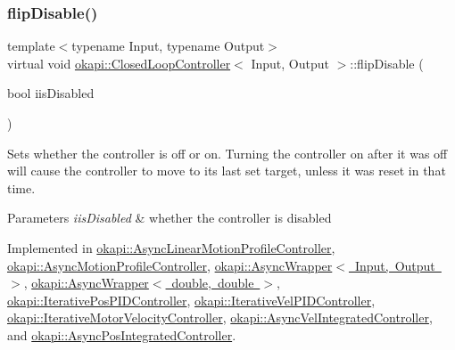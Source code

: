 \mbox{\label{classokapi_1_1ClosedLoopController_a768cd1db40ce9cd5c89b20be6e838ccc}} 
\subsubsection{\texorpdfstring{flipDisable()}{flipDisable()}\hspace{0.1cm}{\footnotesize\ttfamily [2/2]}}
{\footnotesize\ttfamily template$<$typename Input, typename Output$>$ \\
virtual void \mbox{\hyperlink{classokapi_1_1ClosedLoopController}{okapi\+::\+Closed\+Loop\+Controller}}$<$ Input, Output $>$\+::flip\+Disable (\begin{DoxyParamCaption}\item[{bool}]{iis\+Disabled }\end{DoxyParamCaption})\hspace{0.3cm}{\ttfamily [pure virtual]}}

Sets whether the controller is off or on. Turning the controller on after it was off will cause the controller to move to its last set target, unless it was reset in that time.


\begin{DoxyParams}{Parameters}
{\em iis\+Disabled} & whether the controller is disabled \\
\hline
\end{DoxyParams}


Implemented in \mbox{\hyperlink{classokapi_1_1AsyncLinearMotionProfileController_a3072d7ac1e5d0f387f739657e9f82fd8}{okapi\+::\+Async\+Linear\+Motion\+Profile\+Controller}}, \mbox{\hyperlink{classokapi_1_1AsyncMotionProfileController_a3dc30b14b36f1fc1fc61c9c45ced002e}{okapi\+::\+Async\+Motion\+Profile\+Controller}}, \mbox{\hyperlink{classokapi_1_1AsyncWrapper_ab47f9a7ee52a5d699cb39b21b0926981}{okapi\+::\+Async\+Wrapper$<$ Input, Output $>$}}, \mbox{\hyperlink{classokapi_1_1AsyncWrapper_ab47f9a7ee52a5d699cb39b21b0926981}{okapi\+::\+Async\+Wrapper$<$ double, double $>$}}, \mbox{\hyperlink{classokapi_1_1IterativePosPIDController_a5b0755a4839a25af4c5fa7f4e03398ca}{okapi\+::\+Iterative\+Pos\+P\+I\+D\+Controller}}, \mbox{\hyperlink{classokapi_1_1IterativeVelPIDController_a6bd2a04813b0fd99f0904808ff963f28}{okapi\+::\+Iterative\+Vel\+P\+I\+D\+Controller}}, \mbox{\hyperlink{classokapi_1_1IterativeMotorVelocityController_a8419fd62ca804f0446204b59ce37d01c}{okapi\+::\+Iterative\+Motor\+Velocity\+Controller}}, \mbox{\hyperlink{classokapi_1_1AsyncVelIntegratedController_a1e906e904500fe920ea4cad6a922b523}{okapi\+::\+Async\+Vel\+Integrated\+Controller}}, and \mbox{\hyperlink{classokapi_1_1AsyncPosIntegratedController_a6476dde71ef77fceb1c461b4f0ebe62b}{okapi\+::\+Async\+Pos\+Integrated\+Controller}}.

